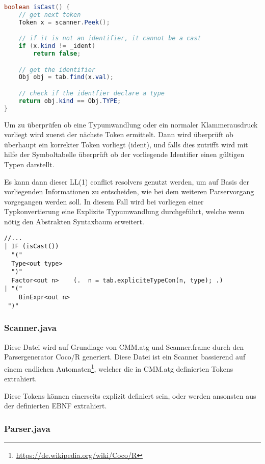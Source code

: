 \begin{lstlisting}[language=Java]
boolean isCast() {
	// get next token
	Token x = scanner.Peek();

	// if it is not an identifier, it cannot be a cast
	if (x.kind != _ident) 
		return false;

	// get the identifier
	Obj obj = tab.find(x.val);

	// check if the identfier declare a type
	return obj.kind == Obj.TYPE;
}
\end{lstlisting}

Um zu \"uberpr\"ufen ob eine Typumwandlung oder ein normaler Klammerausdruck vorliegt wird zuerst der n\"achste Token ermittelt. Dann wird \"uberpr\"uft ob \"uberhaupt ein korrekter Token vorliegt (ident), und falls dies zutrifft wird mit hilfe der Symboltabelle \"uberpr\"uft ob der vorliegende Identifier einen g\"ultigen Typen darstellt.

Es kann dann dieser LL(1) conflict resolvers genutzt werden, um auf Basis der vorliegenden Informationen zu entscheiden, wie bei dem weiteren Parservorgang vorgegangen werden soll. In diesem Fall wird bei vorliegen einer Typkonvertierung eine Explizite Typumwandlung durchgef\"uhrt, welche wenn n\"otig den Abstrakten Syntaxbaum erweitert.

\begin{lstlisting}[language=EBNF]
//...
| IF (isCast())                        
  "(" 
  Type<out type>
  ")"
  Factor<out n>    (.  n = tab.expliciteTypeCon(n, type); .)
| "("
    BinExpr<out n>
 ")"
\end{lstlisting}

\subsubsection{Scanner.java}

Diese Datei wird auf Grundlage von CMM.atg und Scanner.frame durch den Parsergenerator Coco/R generiert. Diese Datei ist ein Scanner bassierend auf einem endlichen Automaten\footnote{\url{https://de.wikipedia.org/wiki/Coco/R}}, welcher die in CMM.atg definierten Tokens extrahiert.

Diese Tokens k\"onnen einerseits explizit definiert sein, oder werden ansonsten aus der definierten EBNF extrahiert.

\subsubsection{Parser.java}

